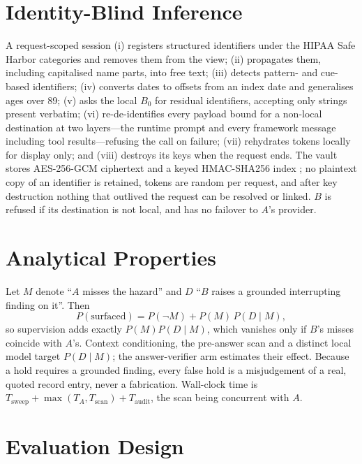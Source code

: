 \documentclass[journal]{IEEEtran}
\begin{document}
\section{Identity-Blind Inference}
A request-scoped session (i) registers structured identifiers under the HIPAA Safe Harbor categories \cite{hhs2012} and removes them from the view; (ii) propagates them, including capitalised name parts, into free text; (iii) detects pattern- and cue-based identifiers; (iv) converts dates to offsets from an index date and generalises ages over 89; (v) asks the local $B_0$ for residual identifiers, accepting only strings present verbatim; (vi) re-de-identifies every payload bound for a non-local destination at two layers---the runtime prompt and every framework message including tool results---refusing the call on failure; (vii) rehydrates tokens locally for display only; and (viii) destroys its keys when the request ends. The vault stores AES-256-GCM ciphertext \cite{nist38d} and a keyed HMAC-SHA256 index \cite{rfc2104}; no plaintext copy of an identifier is retained, tokens are random per request, and after key destruction nothing that outlived the request can be resolved or linked. $B$ is refused if its destination is not local, and has no failover to $A$'s provider.

\section{Analytical Properties}
Let $M$ denote ``$A$ misses the hazard'' and $D$ ``$B$ raises a grounded interrupting finding on it''. Then
\begin{equation}
P(\text{surfaced}) = P(\neg M) + P(M)\,P(D\mid M),
\end{equation}
so supervision adds exactly $P(M)P(D\mid M)$, which vanishes only if $B$'s misses coincide with $A$'s. Context conditioning, the pre-answer scan and a distinct local model target $P(D\mid M)$; the answer-verifier arm estimates their effect. Because a hold requires a grounded finding, every false hold is a misjudgement of a real, quoted record entry, never a fabrication. Wall-clock time is $T_{\text{sweep}}+\max(T_A,T_{\text{scan}})+T_{\text{audit}}$, the scan being concurrent with $A$.

\section{Evaluation Design}
\end{document}

